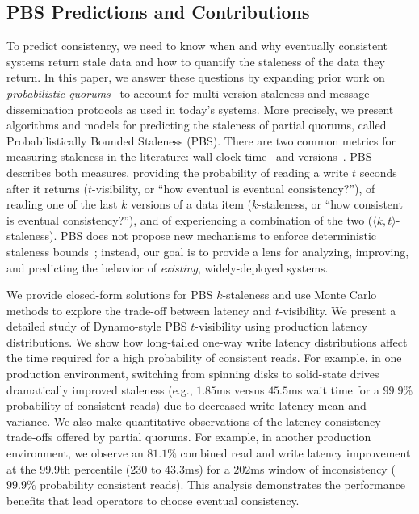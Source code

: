\documentclass{vldb}
\begin{document}
\subsection{PBS Predictions and Contributions}

To predict consistency, we need to know when and why eventually
consistent systems return stale data and how to quantify the staleness
of the data they return.  In this paper, we answer these questions by
expanding prior work on \textit{probabilistic
  quorums}~\cite{prob-quorum, quorum-overview} to account for
multi-version staleness and message dissemination protocols as used in
today's systems. More precisely, we present algorithms and models for
predicting the staleness of partial quorums, called Probabilistically
Bounded Staleness (PBS). There are two common metrics for measuring
staleness in the literature: wall clock time~\cite{podc-hpl,
  vahdat-article, vahdat-bounded} and versions~\cite{podc-hpl, aqua,
  frac}.  PBS describes both measures, providing the probability of
reading a write $t$ seconds after it returns ($t$-visibility, or
``how eventual is eventual consistency?''), of reading one of the last
$k$ versions of a data item ($k$-staleness, or ``how consistent is
eventual consistency?''), and of experiencing a combination of the two
($\langle k, t \rangle$-staleness). PBS does not propose new
mechanisms to enforce deterministic staleness bounds~\cite{ aqua,
  trapp,vahdat-article, vahdat-bounded, frac}; instead, our goal is to
provide a lens for analyzing, improving, and predicting the behavior
of \textit{existing}, widely-deployed systems.

We provide closed-form solutions for PBS $k$-staleness and use Monte
Carlo methods to explore the trade-off between latency and
$t$-visibility.  We present a detailed study of Dynamo-style PBS
$t$-visibility using production latency distributions. We show how
long-tailed one-way write latency distributions affect the
time required for a high probability of consistent reads.  For
example, in one production environment, switching from spinning disks
to solid-state drives dramatically improved staleness (e.g., $1.85$ms
versus $45.5$ms wait time for a $99.9$\% probability of consistent
reads) due to decreased write latency mean and variance.  We also make
quantitative observations of the latency-consistency trade-offs
offered by partial quorums.  For example, in another production
environment, we observe an $81.1\%$ combined read and write latency
improvement at the $99.9$th percentile ($230$ to $43.3$ms) for a
$202$ms window of inconsistency ($99.9\%$ probability consistent
reads). This analysis demonstrates the performance benefits that lead
operators to choose eventual consistency.
\end{document}
